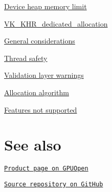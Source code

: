 \begin{DoxyItemize}
\begin{DoxyItemize}
\item \hyperlink{configuration_heap_memory_limit}{Device heap memory limit}
\item \hyperlink{vk_khr_dedicated_allocation}{V\+K\+\_\+\+K\+H\+R\+\_\+dedicated\+\_\+allocation}
\end{DoxyItemize}
\item \hyperlink{general_considerations}{General considerations}
\begin{DoxyItemize}
\item \hyperlink{general_considerations_general_considerations_thread_safety}{Thread safety}
\item \hyperlink{general_considerations_general_considerations_validation_layer_warnings}{Validation layer warnings}
\item \hyperlink{general_considerations_general_considerations_allocation_algorithm}{Allocation algorithm}
\item \hyperlink{general_considerations_general_considerations_features_not_supported}{Features not supported}
\end{DoxyItemize}
\end{DoxyItemize}\hypertarget{index_main_see_also}{}\section{See also}\label{index_main_see_also}

\begin{DoxyItemize}
\item \href{https://gpuopen.com/gaming-product/vulkan-memory-allocator/}{\tt Product page on G\+P\+U\+Open}
\item \href{https://github.com/GPUOpen-LibrariesAndSDKs/VulkanMemoryAllocator}{\tt Source repository on Git\+Hub} 
\end{DoxyItemize}